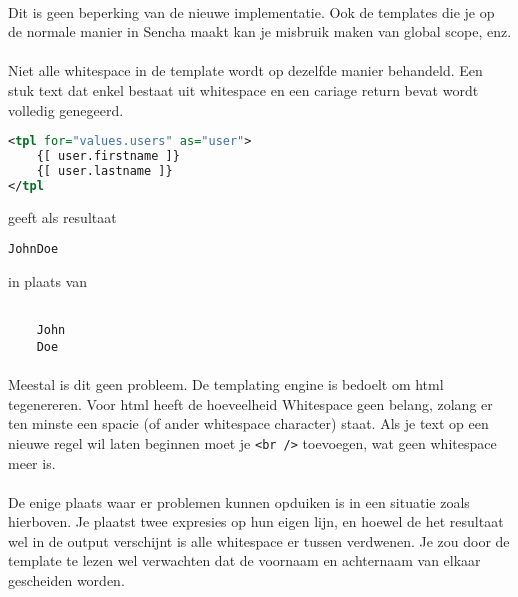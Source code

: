\paragraph {} Dit is geen beperking van de nieuwe implementatie. Ook de templates die je
op de normale manier in Sencha maakt kan je misbruik maken van global scope, enz.

\paragraph {} Niet alle whitespace in de template wordt op dezelfde manier behandeld. Een
stuk text dat enkel bestaat uit whitespace en een cariage return bevat wordt volledig
genegeerd.

\begin{lstlisting}[language=xml]
<tpl for="values.users" as="user">
	{[ user.firstname ]}
	{[ user.lastname ]}
</tpl
\end{lstlisting}

geeft als resultaat

\begin{lstlisting}
JohnDoe
\end{lstlisting}

in plaats van 

\begin{lstlisting}

	John
	Doe

\end{lstlisting}

\paragraph {} Meestal is dit geen probleem. De templating engine is bedoelt om html
tegenereren. Voor html heeft de hoeveelheid Whitespace geen belang, zolang er ten minste
een spacie (of ander whitespace character) staat. Als je text op een nieuwe regel wil
laten beginnen moet je \lstinline{<br />} toevoegen, wat geen whitespace meer is.

\paragraph {} De enige plaats waar er problemen kunnen opduiken is in een situatie zoals
hierboven. Je plaatst twee expresies op hun eigen lijn, en hoewel de het resultaat wel in
de output verschijnt is alle whitespace er tussen verdwenen. Je zou door de template te
lezen wel verwachten dat de voornaam en achternaam van elkaar gescheiden worden.


